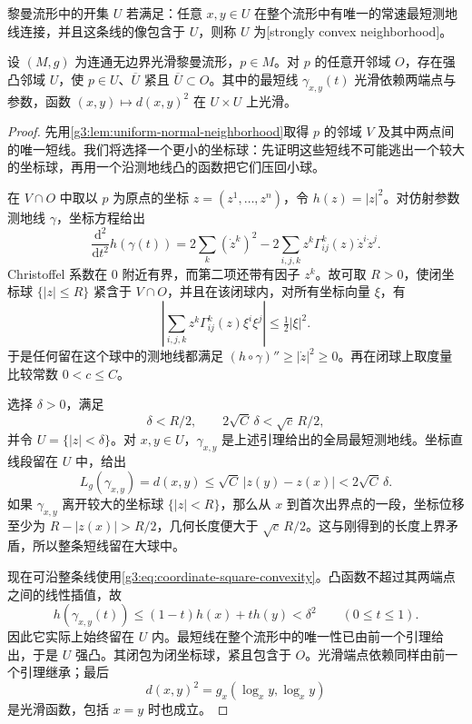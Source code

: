 \begin{definition}
	\label{g3:def:strongly-convex-neighborhood}
	黎曼流形中的开集 \(U\) 若满足：任意 \(x,y\in U\) 在整个流形中有唯一的常速最短测地线连接，并且这条线的像包含于 \(U\)，则称 \(U\) 为[strongly convex neighborhood]。
\end{definition}

\begin{theorem}
	\label{g3:thm:strongly-convex-neighborhood}
	设 \((M,g)\) 为连通无边界光滑黎曼流形，\(p\in M\)。对 \(p\) 的任意开邻域 \(O\)，存在强凸邻域 \(U\)，使 \(p\in U\)、\(\overline U\) 紧且 \(\overline U\subset O\)。其中的最短线 \(\gamma_{x,y}(t)\) 光滑依赖两端点与参数，函数 \((x,y)\mapsto d(x,y)^2\) 在 \(U\times U\) 上光滑。
\end{theorem}
\begin{proof}
	先用\cref{g3:lem:uniform-normal-neighborhood}取得 \(p\) 的邻域 \(V\) 及其中两点间的唯一短线。我们将选择一个更小的坐标球：先证明这些短线不可能逃出一个较大的坐标球，再用一个沿测地线凸的函数把它们压回小球。

	在 \(V\cap O\) 中取以 \(p\) 为原点的坐标 \(z=(z^1,\ldots,z^n)\)，令 \(h(z)=|z|^2\)。对仿射参数测地线 \(\gamma\)，坐标方程给出
	\begin{equation}
		\label{g3:eq:coordinate-square-convexity}
		\frac{\mathrm{d}^2}{\mathrm{d}t^2}h(\gamma(t))
		=2\sum_k(\dot z^k)^2
		-2\sum_{i,j,k}z^k\Gamma^k_{ij}(z)\dot z^i\dot z^j.
	\end{equation}
	Christoffel 系数在 \(0\) 附近有界，而第二项还带有因子 \(z^k\)。故可取 \(R>0\)，使闭坐标球 \(\{|z|\leq R\}\) 紧含于 \(V\cap O\)，并且在该闭球内，对所有坐标向量 \(\xi\)，有
	\[
		\left|\sum_{i,j,k}z^k\Gamma^k_{ij}(z)\xi^i\xi^j\right|
		\leq\tfrac12|\xi|^2.
	\]
	于是任何留在这个球中的测地线都满足 \((h\circ\gamma)''\geq|\dot z|^2\geq0\)。再在闭球上取度量比较常数 \(0<c\leq C\)。

	选择 \(\delta>0\)，满足
	\[
		\delta<R/2,\qquad 2\sqrt C\,\delta<\sqrt c\,R/2,
	\]
	并令 \(U=\{|z|<\delta\}\)。对 \(x,y\in U\)，\(\gamma_{x,y}\) 是上述引理给出的全局最短测地线。坐标直线段留在 \(U\) 中，给出
	\[
		L_g(\gamma_{x,y})=d(x,y)\leq\sqrt C\,|z(y)-z(x)|
		<2\sqrt C\,\delta.
	\]
	如果 \(\gamma_{x,y}\) 离开较大的坐标球 \(\{|z|<R\}\)，那么从 \(x\) 到首次出界点的一段，坐标位移至少为 \(R-|z(x)|>R/2\)，几何长度便大于 \(\sqrt c\,R/2\)。这与刚得到的长度上界矛盾，所以整条短线留在大球中。

	现在可沿整条线使用\eqref{g3:eq:coordinate-square-convexity}。凸函数不超过其两端点之间的线性插值，故
	\[
		h(\gamma_{x,y}(t))\leq(1-t)h(x)+th(y)<\delta^2
		\qquad(0\leq t\leq1).
	\]
	因此它实际上始终留在 \(U\) 内。最短线在整个流形中的唯一性已由前一个引理给出，于是 \(U\) 强凸。其闭包为闭坐标球，紧且包含于 \(O\)。光滑端点依赖同样由前一个引理继承；最后
	\[
		d(x,y)^2=g_x(\log_xy,\log_xy)
	\]
	是光滑函数，包括 \(x=y\) 时也成立。
\end{proof}

